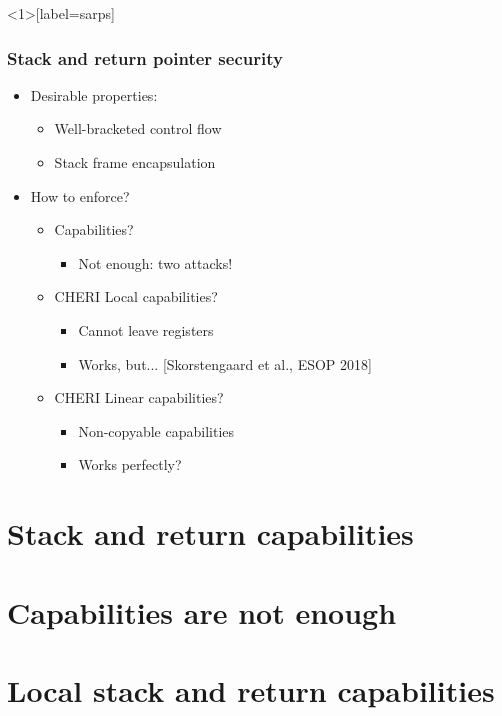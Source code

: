\documentclass{beamer}
\begin{document}
\begin{frame}<1>[label=sarps]
  \frametitle{Stack and return pointer security}
  \begin{itemize}
  \item Desirable properties:
    \begin{itemize}
    \item Well-bracketed control flow
    \item Stack frame encapsulation
    \end{itemize}
  \item How to enforce?
    \begin{itemize}
    \item Capabilities?
      \begin{itemize}
      \item<2-> Not enough: two attacks!
      \end{itemize}
    \item<3-> CHERI Local capabilities?
      \begin{itemize}
      \item Cannot leave registers
      \item<4-> Works, but... [Skorstengaard et al., ESOP 2018]
      \end{itemize}
    \item<5-> CHERI Linear capabilities?
      \begin{itemize}
      \item Non-copyable capabilities
      \item<6> Works perfectly?
      \end{itemize}
    \end{itemize}
  \end{itemize}
\end{frame}

\section{Stack and return capabilities}


\section{Capabilities are not enough}


\section{Local stack and return capabilities}

\end{document}
